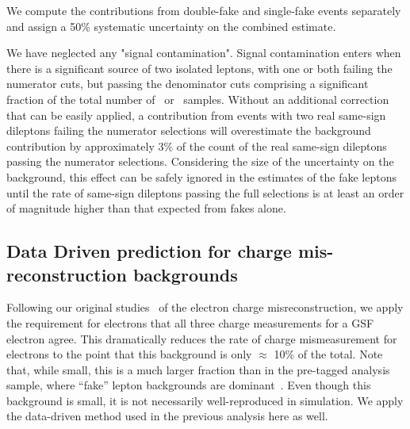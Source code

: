 We compute the contributions from double-fake and single-fake events separately and assign a 50\% systematic
uncertainty on the combined estimate.

We have neglected any "signal contamination". 
Signal contamination enters when there is a significant
source of two isolated leptons, with one or both failing the numerator cuts, but passing the denominator cuts
comprising  a significant fraction of the total number of \nNoNu\ or \nNoNo\ samples. 
Without an additional correction that can be easily applied,
a contribution from events with two real same-sign dileptons failing the numerator selections
 will overestimate the background contribution by approximately 3\% of the count of
the real same-sign dileptons passing the numerator selections.
Considering the size of the uncertainty on the background,
this effect can be safely ignored in the estimates 
of the fake leptons until the rate of same-sign dileptons passing the full
selections is at least an order of magnitude  higher than that expected
from fakes alone.


\subsection{Data Driven prediction for charge mis-reconstruction backgrounds}
\label{sec:flips}


Following our original studies~\cite{sspaper2010} of the electron charge misreconstruction, 
we apply the requirement for electrons that all three charge measurements for a GSF electron agree. 
This dramatically reduces the rate of charge mismeasurement for electrons to
the point that this background is only $\approx$ 10\% of the total.  Note 
that, while small, this is a much larger fraction than in
the pre-tagged analysis sample, where ``fake'' lepton backgrounds are
dominant~\cite{sspaper2010,sspaper201,ssnote2011}.
Even though this background is small, it is not necessarily 
well-reproduced in simulation.
We apply the data-driven method used in the previous 
analysis\cite{sspaper2010,sspaper2011,ssnote2011}
here
as well.

